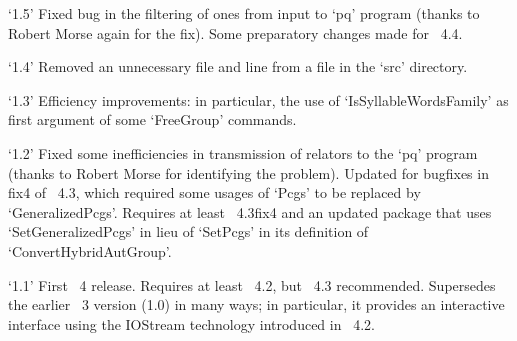 \item{`1.5'}
Fixed bug in the filtering of ones from input to `pq' program (thanks  to
Robert Morse again for  the  fix).  Some  preparatory  changes  made  for
{\GAP}~4.4.

\item{`1.4'}
Removed an unnecessary file and line from a file in the `src' directory.

\item{`1.3'}
Efficiency improvements: in particular, the use of `IsSyllableWordsFamily'
as first argument of some `FreeGroup' commands.

\item{`1.2'}
Fixed some inefficiencies in transmission of relators to the `pq' program
(thanks to  Robert  Morse  for  identifying  the  problem).  Updated  for
bugfixes in fix4 of {\GAP}~4.3, which required some usages of  `Pcgs'  to
be replaced by `GeneralizedPcgs'. Requires at least {\GAP}~4.3fix4 and an
updated {\AutPGrp} package that  uses  `SetGeneralizedPcgs'  in  lieu  of
`SetPcgs' in its definition of `ConvertHybridAutGroup'.

\item{`1.1'}
First {\GAP}~4 release. Requires  at  least  {\GAP}~4.2,  but  {\GAP}~4.3
recommended. Supersedes the earlier {\GAP}~3 version (1.0) in many  ways;
in particular, it provides an interactive interface  using  the  IOStream
technology introduced in {\GAP}~4.2.

\endlist

